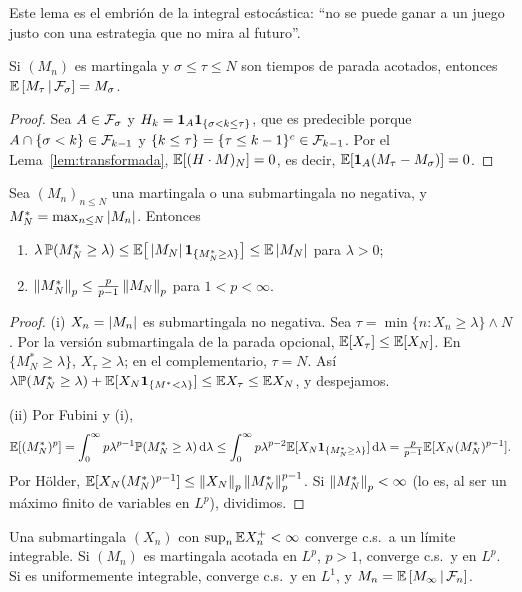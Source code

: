 Este lema es el embrión de la integral estocástica: ``no se puede ganar a un juego justo con
una estrategia que no mira al futuro''.

\begin{teorema}\label{teo:parada}
Si $(M_n)$ es martingala y $\sigma\le\tau\le N$ son
tiempos de parada acotados, entonces $\mathbb{E}\left[M_\tau\,\middle|\,\mathcal{F}_\sigma\right]=M_\sigma$.
\end{teorema}

\begin{proof}
Sea $A\in\mathcal{F}_\sigma$ y $H_k=\mathbf{1}_A\mathbf{1}_{\{\sigma<k\le\tau\}}$, que es predecible porque $A\cap\{\sigma<k\}\in\mathcal{F}_{k-1}$ y
$\{k\le\tau\}=\{\tau\le k-1\}^c\in\mathcal{F}_{k-1}$. Por el Lema~\ref{lem:transformada}, $\mathbb{E}[(H\cdot M)_N]=0$, es decir, $\mathbb{E}[\mathbf{1}_A(M_\tau-M_\sigma)]=0$.
\end{proof}

\begin{teorema}\label{teo:doob}
Sea $(M_n)_{n\le N}$ una martingala o una submartingala
no negativa, y $M_N^*=\max_{n\le N}\left\lvert M_n\right\rvert$. Entonces
\begin{enumerate}[label=(\roman*)]
  \item $\lambda\,\mathbb{P}(M_N^*\ge\lambda)\le\mathbb{E}\big[\left\lvert M_N\right\rvert\mathbf{1}_{\{M_N^*\ge\lambda\}}\big]\le\mathbb{E}\left\lvert M_N\right\rvert$ para $\lambda>0$;
  \item $\left\lVert M_N^*\right\rVert_p\le\frac{p}{p-1}\left\lVert M_N\right\rVert_p$ para $1<p<\infty$.
\end{enumerate}
\end{teorema}

\begin{proof}
(i) $X_n=\left\lvert M_n\right\rvert$ es submartingala no negativa. Sea $\tau=\min\{n:X_n\ge\lambda\}\wedge N$.
Por la versión submartingala de la parada opcional, $\mathbb{E}[X_\tau]\le\mathbb{E}[X_N]$. En $\{M_N^*\ge\lambda\}$, $X_\tau\ge\lambda$; en
el complementario, $\tau=N$. Así $\lambda\mathbb{P}(M_N^*\ge\lambda)+\mathbb{E}[X_N\mathbf{1}_{\{M^*<\lambda\}}]\le\mathbb{E} X_\tau\le\mathbb{E} X_N$, y despejamos.

(ii) Por Fubini y (i),
\[
  \mathbb{E}[(M_N^*)^p]=\int_0^\infty p\lambda^{p-1}\mathbb{P}(M_N^*\ge\lambda)\,\mathrm{d}\lambda\le\int_0^\infty p\lambda^{p-2}\mathbb{E}[X_N\mathbf{1}_{\{M_N^*\ge\lambda\}}]\,\mathrm{d}\lambda=\tfrac{p}{p-1}\mathbb{E}[X_N(M_N^*)^{p-1}].
\]
Por Hölder, $\mathbb{E}[X_N(M_N^*)^{p-1}]\le\left\lVert X_N\right\rVert_p\left\lVert M_N^*\right\rVert_p^{p-1}$. Si $\left\lVert M_N^*\right\rVert_p<\infty$ (lo es, al ser un máximo finito
de variables en $L^p$), dividimos.
\end{proof}

\begin{teorema}
Una submartingala $(X_n)$ con $\sup_n\mathbb{E} X_n^+<\infty$
converge c.s.\ a un límite integrable. Si $(M_n)$ es martingala acotada en $L^p$, $p>1$, converge
c.s.\ y en $L^p$. Si es uniformemente integrable, converge c.s.\ y en $L^1$, y $M_n=\mathbb{E}\left[M_\infty\,\middle|\,\mathcal{F}_n\right]$.
\end{teorema}


